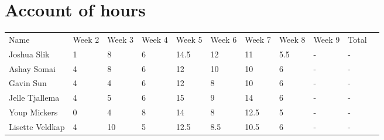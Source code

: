 \chapter{Account of hours}

\begin{table}[h]
\begin{tabular}{| l | l | l | l | l | l | l | l | l | l | l}
 Name & Week 2 & Week 3 & Week 4 & Week 5 & Week 6 & Week 7 & Week 8 & Week 9 & Total & \\
 Joshua Slik & 1 & 8 & 6 & 14.5 & 12 & 11 & 5.5 & - & - & \\
 Ashay Somai & 4 & 8 & 6 & 12 & 10 & 10 & 6 & - & - & \\
 Gavin Sun & 4 & 4 & 6 & 12 & 8 & 10 & 6 & - & - & \\
 Jelle Tjallema & 4 & 5 & 6 & 15 & 9 & 14 & 6 & - & - & \\
 Youp Mickers & 0 & 4 & 8 & 14 & 8 & 12.5 & 5 & - & - & \\
 Lisette Veldkap & 4 & 10 & 5 & 12.5 & 8.5 & 10.5 & 6 & - & - & \\
\end{tabular}
\end{table}